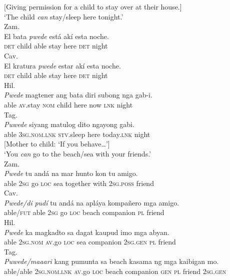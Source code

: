 \documentclass[output=paper,colorlinks,citecolor=brown]{langscibook}
\begin{document}
\ea\label{bkm:Ref1510171}[Giving permission for a child to stay over at their house.] \\
{‘The child \textit{can} stay/sleep here tonight.’}\\
\ea
{Zam.}\\
\gll El bata \textit{pwede} está akí esta noche.\\
     \textsc{det} child able stay here \textsc{det} night\\
\ex
{Cav.}\\
\gll El kratura \textit{pwede} estar akí esta noche.\\
     \textsc{det} child able stay here \textsc{det} night\\
\ex
{Hil.}\\
\gll \textit{Pwede} magtener  ang    bata diri subong nga gab-i.\\
     {able}           \textsc{av}{.stay} \textsc{nom} child here now \textsc{lnk} {night}\\
\ex
{Tag.}\\
\gll \textit{Puwede} siyang matulog dito ngayong gabi.\\
     able 3\textsc{sg.nom.lnk} \textsc{stv}.sleep here today.\textsc{lnk} night\\
\z
\ex
{\label{bkm:Ref52741551}[Mother to child: ‘If you behave…’]} \\
{‘You \textit{can} go to the beach/sea with your friends.’}\\
\ea
{Zam.}\\
\gll \textit{Pwede} tu andá na mar hunto kon tu amigo.\\
     able 2\textsc{sg} go \textsc{loc} sea together with 2\textsc{sg}.\textsc{poss} friend\\
\ex
{Cav.}\\
\gll \textit{Pwede/di} \textit{pudí} tu andá na apláya kompañero mga amigo.\\
     able/\textsc{fut} able 2\textsc{sg} go \textsc{loc} beach companion \textsc{pl} friend\\
\ex
{Hil.}\\
\gll \textit{Pwede} ka magkadto sa dagat kaupud imo mga abyan.\\
     able 2\textsc{sg}.\textsc{nom} \textsc{av.}go \textsc{loc} sea companion 2\textsc{sg.gen} \textsc{pl} friend\\
\ex
{Tag.}\\
\gll \textit{Puwede/maaari} kang pumunta sa beach kasama ng mga kaibigan mo.\\
     able/able 2\textsc{sg.nom.lnk} \textsc{av}.go \textsc{loc} beach companion \textsc{gen} \textsc{pl} friend 2\textsc{sg.gen}\\
\z
\z
\end{document}
